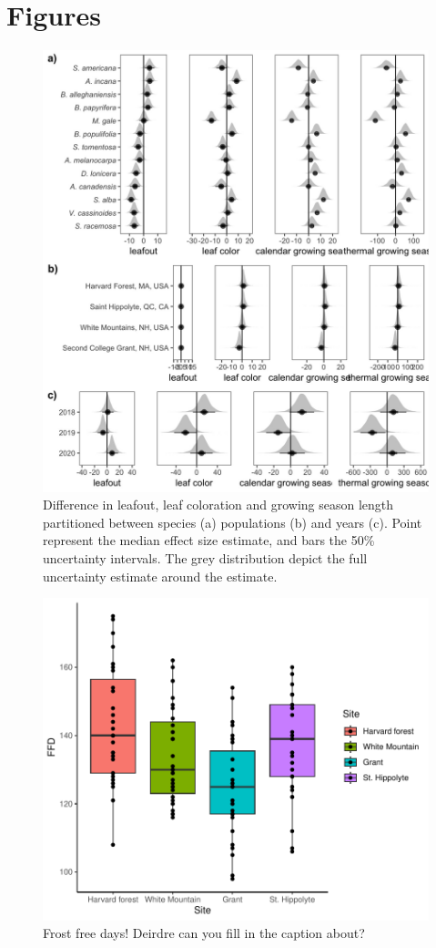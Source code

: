 \documentclass{article}[11pt]
\begin{document}
\section{Figures}
 \begin{figure}[h!]
    \centering
 \includegraphics[width=.8\textwidth]{..//analyses/figures/full_var_parts.jpeg}
    \caption{Difference in leafout, leaf coloration and growing season length partitioned between species (a) populations (b) and years (c). Point represent the median effect size estimate, and bars the 50\% uncertainty intervals. The grey distribution depict the full uncertainty estimate around the estimate.}
    \label{fig:alta}
\end{figure}


\begin{figure}[h!]
    \centering
 \includegraphics[width=.7\textwidth]{..//analyses/figures/ffdBySite.pdf}
    \caption{Frost free days! Deirdre can you fill in the caption about?}
    \label{fig:ffd}
\end{figure}
\end{document}
